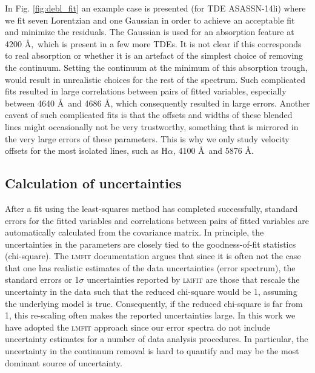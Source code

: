 \documentclass[structabstract]{aa}
\begin{document}
In Fig. \ref{fig:debl_fit} an example case is presented (for TDE ASASSN-14li) where we fit seven Lorentzian and one Gaussian in order to achieve an acceptable fit and minimize the residuals. The Gaussian is used for an absorption feature at 4200 \AA,\, which is present in a few more TDEs. It is not clear if this corresponds to real absorption or whether it is an artefact of the simplest choice of removing the continuum. Setting the continuum at the minimum of this absorption trough, would result in unrealistic choices for the rest of the spectrum. Such complicated fits resulted in large correlations between pairs of fitted variables, especially between  4640 \AA\, and  4686 \AA, which consequently resulted in large errors. Another caveat of such complicated fits is that the offsets and widths of these blended lines might occasionally not be very trustworthy, something that is mirrored in the very large errors of these parameters. This is why we only study velocity offsets for the most isolated lines, such as H$\alpha$,  4100 \AA\, and  5876 \AA.


\subsection{Calculation of uncertainties}
\label{subsub:cou}
After a fit using the least-squares method has completed successfully, standard errors for the fitted variables and correlations between pairs of fitted variables are automatically calculated from the covariance matrix. In principle, the uncertainties in the parameters are closely tied to the goodness-of-fit statistics (chi-square). 
The \textsc{lmfit} documentation argues that since it is often not the case that one has realistic estimates of the data uncertainties (error spectrum), the standard errors or 1$\sigma$ uncertainties reported by \textsc{lmfit}  
are those that rescale the uncertainty in the data such that the reduced chi-square would be 1, assuming the underlying model is true. Consequently, if the reduced chi-square is far from 1, this re-scaling often makes the reported uncertainties large. 
In this work we have adopted the \textsc{lmfit} approach
since our error spectra do not include uncertainty estimates for a number of data analysis procedures.
In particular, the uncertainty in the continuum removal is hard to quantify and may be the most dominant source of uncertainty.
\end{document}
